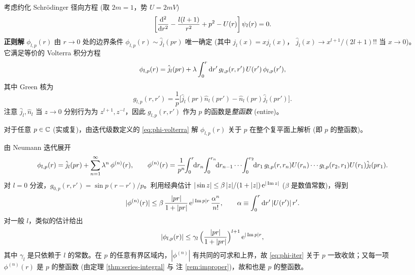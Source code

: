 考虑约化 Schr\"odinger 径向方程 (取 $2m=1$，势 $U=2mV$)
\begin{equation}
\left[\frac{\mathrm{d}^2}{\mathrm{d} r^2}-\frac{l(l+1)}{r^2}+p^2-U(r)\right]\psi_l(r)=0.
\label{eq:radial}
\end{equation}
\textbf{正则解} $\phi_{l,p}(r)$ 由 $r\to0$ 处的边界条件
$\phi_{l,p}(r)\sim \hat{j}_l(pr)$ 唯一确定 (其中 $\hat{j}_l(x)=xj_l(x)$，
$\hat{j}_l(x)\to x^{l+1}/(2l+1)!!$ 当 $x\to 0$)。它满足等价的 Volterra
积分方程
\begin{equation}
\phi_{l,p}(r)=\hat{j}_l(pr)+\lambda\int_0^r \mathrm{d} r'\,g_{l,p}(r,r')\,U(r')\,\phi_{l,p}(r'),
\label{eq:phi-volterra}
\end{equation}
其中 Green 核为
\begin{equation}
g_{l,p}(r,r')=\frac{1}{p}\bigl[\hat j_l(pr)\hat n_l(pr')-\hat n_l(pr)\hat j_l(pr')\bigr].
\label{eq:greenkernel}
\end{equation}
注意 $\hat j_l, \hat n_l$ 当 $z\to 0$ 分别行为为 $z^{l+1}, z^{-l}$，因此 $g_{l,p}(r,r')$
作为 $p$ 的函数是\emph{整函数} (entire)。

\begin{theorem}\label{thm:phi-entire}
对于任意 $p\in\mathbb{C}$ (实或复)，由迭代级数定义的 \eqref{eq:phi-volterra} 解
$\phi_{l,p}(r)$ 关于 $p$ 在整个复平面上解析 (即 $p$ 的整函数)。
\end{theorem}

\begin{proof*}
由 Neumann 迭代展开
\begin{equation}
\phi_{l,p}(r)=\hat j_l(pr)+\sum_{n=1}^\infty \lambda^n\,\phi^{(n)}(r),\qquad
\phi^{(n)}(r)=\frac{1}{p^n}\!\!\int_0^r\!\!\rmd r_n\!\int_0^{r_n}\!\!\rmd r_{n-1}\cdots
\!\int_0^{r_2}\!\!\rmd r_1\,
g_{l,p}(r,r_n)U(r_n)\cdots g_{l,p}(r_2,r_1)U(r_1)\hat j_l(pr_1).
\label{eq:phi-iter}
\end{equation}
对 $l=0$ 分波，$g_{0,p}(r,r')=\sin p(r-r')/p$。利用经典估计
$|\sin z|\leq \beta\,|z|/(1+|z|)\,\mathrm{e}^{|\Im z|}$ ($\beta$ 是数值常数)，得到
\begin{equation}
|\phi^{(n)}(r)|\leq \beta\,\frac{|pr|}{1+|pr|}\,\mathrm{e}^{|\Im p|r}\,\frac{\alpha^n}{n!},\qquad
\alpha\equiv\int_0^r\mathrm{d} r'\,|U(r')|\,r'.
\label{eq:phi-bound-l0}
\end{equation}
对一般 $l$，类似的估计给出
\begin{equation}
|\phi_{l,p}(r)|\leq \gamma_l\,\Bigl(\frac{|pr|}{1+|pr|}\Bigr)^{l+1}\,\mathrm{e}^{|\Im p|r},
\label{eq:phi-bound-general}
\end{equation}
其中 $\gamma_l$ 是只依赖于 $l$ 的常数。在 $p$ 的任意有界区域内，$|\phi^{(n)}|$
有共同的可求和上界，故 \eqref{eq:phi-iter} 关于 $p$ 一致收敛；又每一项
$\phi^{(n)}(r)$ 是 $p$ 的整函数 (由定理 \ref{thm:series-integral} 与
注 \ref{rem:improper})，故和也是 $p$ 的整函数。
\end{proof*}

